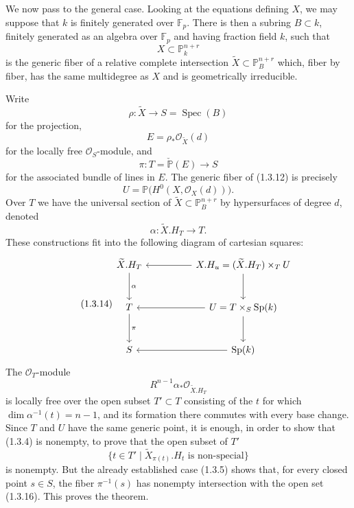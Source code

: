 \par\medskip
We now pass to the general case.  Looking at the equations defining $X$, we
may suppose that $k$ is finitely generated over $\mathbb F_p$.  There is
then a subring $B\subset k$, finitely generated as an algebra over
$\mathbb F_p$ and having fraction field $k$, such that
\begin{equation}\tag{1.3.9}
X\subset\mathbb P_k^{n+r}
\end{equation}
is the generic fiber of a relative complete intersection
$\widetilde X\subset\mathbb P_B^{n+r}$ which, fiber by fiber, has the same
multidegree as $X$ and is geometrically irreducible.

Write
\begin{equation}\tag{1.3.10}
\rho:\widetilde X\longrightarrow S=\operatorname{Spec}(B)
\end{equation}
for the projection,
\begin{equation}\tag{1.3.11}
E=\rho_*\mathcal O_{\widetilde X}(d)
\end{equation}
for the locally free $\mathcal O_S$-module, and
\begin{equation}\tag{1.3.12}
\pi:T=\check{\mathbb P}(E)\longrightarrow S
\end{equation}
for the associated bundle of lines in $E$.  The generic fiber of (1.3.12)
is precisely
\[
U=\mathbb P\bigl(H^0(X,\mathcal O_X(d))\bigr).
\]
Over $T$ we have the universal section of
$\widetilde X\subset\mathbb P_B^{n+r}$ by hypersurfaces of degree $d$,
denoted
\begin{equation}\tag{1.3.13}
\alpha:\widetilde X.H_T\longrightarrow T.
\end{equation}
These constructions fit into the following diagram of cartesian squares:
\begin{equation}\tag{1.3.14}
\begin{tikzcd}[column sep=huge,row sep=large]
\widetilde X.H_T \arrow[d,"\alpha"]
  & X.H_u=(\widetilde X.H_T)\times_T U \arrow[l]\arrow[d] \\
T \arrow[d,"\pi"]
  & U=T\times_S\operatorname{Sp}(k) \arrow[l]\arrow[d] \\
S & \operatorname{Sp}(k)\arrow[l]
\end{tikzcd}
\end{equation}
The $\mathcal O_T$-module
\begin{equation}\tag{1.3.15}
R^{n-1}\alpha_*\mathcal O_{\widetilde X.H_T}
\end{equation}
is locally free over the open subset $T'\subset T$ consisting of the
$t$ for which $\dim\alpha^{-1}(t)=n-1$, and its formation there commutes
with every base change.  Since $T$ and $U$ have the same generic point, it
is enough, in order to show that (1.3.4) is nonempty, to prove that the open
subset of $T'$
\begin{equation}\tag{1.3.16}
\bigl\{t\in T'\mid\widetilde X_{\pi(t)}.H_t
   \text{ is non-special}\bigr\}
\end{equation}
is nonempty.  But the already established case (1.3.5) shows that, for
every closed point $s\in S$, the fiber $\pi^{-1}(s)$ has nonempty
intersection with the open set (1.3.16).  This proves the theorem.

